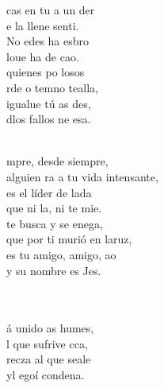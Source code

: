 \begin{cancion}%
	cas en tu a un der \\
	e la llene senti.\\
	No edes ha esbro\\
	loue ha de  cao.\\
\jump
	quienes po losos  \\
	rde o temno tealla,\\
	igualue tú as des,\\
	dlos fallos ne esa.\\\jump\\
	\begin{chorus}%
	mpre, desde siempre,\\
	alguien ra a tu vida intensante,\\
	es el líder de lada\\
	que ni la, ni te mie.\\
\jump
	 te busca y se enega,\\
	que por ti murió en laruz,\\
	es tu amigo, amigo, ao\\
	y su nombre es Jes.\\
	\end{chorus}%
	\jump\\
	      \\
	á unido as humes, \\
	l que sufrive cca,\\
	recza al que seale\\
	yl egoí condena.\\

\end{cancion}
